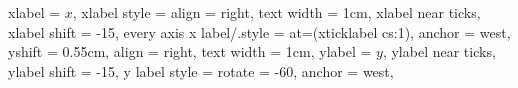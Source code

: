 	xlabel					= {$x$},
	xlabel style			= {align = right, text width = 1cm},
	xlabel near ticks,
	xlabel shift			= -15,
	every axis x label/.style		= {at={(xticklabel cs:1)}, anchor = west, yshift = 0.55cm, align = right, text width = 1cm},
	ylabel					= {$y$},
	ylabel near ticks,
	ylabel shift			= -15,
	y label style			= {rotate = -60, anchor = west},
